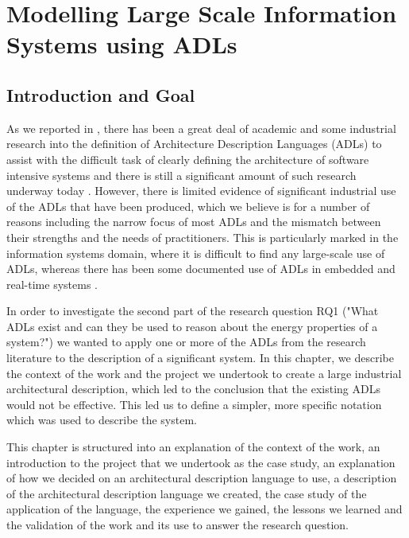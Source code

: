\chapter{Modelling Large Scale Information Systems using ADLs} \label{chapter:usingadls}

\section{Introduction and Goal}

  As we reported in , there has been a great deal of academic and some industrial research into the definition of Architecture Description Languages (ADLs) to assist with the difficult task of clearly defining the architecture of software intensive systems and there is still a significant amount of such research underway today \cite{diruscio2010-byadl, cuenot2010-east}.  However, there is limited evidence of significant industrial use of the ADLs that have been produced, which we believe is for a number of reasons \cite{bashroush2006-flexibleadls, woodshilliard2005-adlsinpractice} including the narrow focus of most ADLs and the mismatch between their strengths and the needs of practitioners.  This is particularly marked in the information systems domain, where it is difficult to find any large-scale use of ADLs, whereas there has been some documented use of ADLs in embedded and real-time systems \cite{oquendo2004-piadl, vanommering2000-koala, allen2002-rtsystems}.

  In order to investigate the second part of the research question RQ1 ("What ADLs exist and can they be used to reason about the energy properties of a system?") we wanted to apply one or more of the ADLs from the research literature to the description of a significant system.  In this chapter, we describe the context of the work and the project we undertook to create a large industrial architectural description, which led to the conclusion that the existing ADLs would not be effective.  This led us to define a simpler, more specific notation which was used to describe the system.

  This chapter is structured into an explanation of the context of the work, an introduction to the project that we undertook as the case study, an explanation of how we decided on an architectural description language to use, a description of the architectural description language we created, the case study of the application of the language, the experience we gained, the lessons we learned and the validation of the work and its use to answer the research question.

